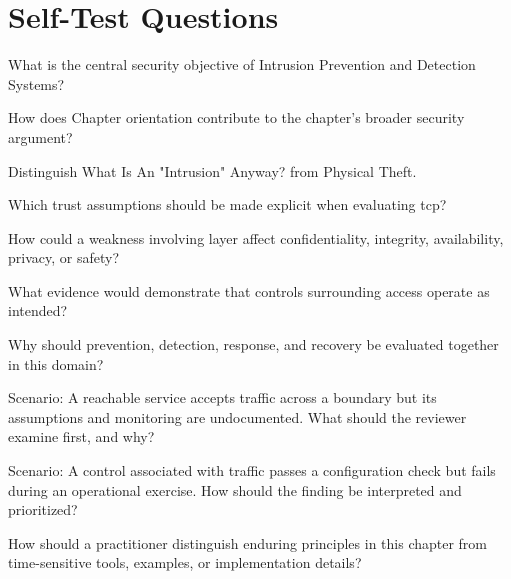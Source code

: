\documentclass[11pt,letterpaper]{article}
\begin{document}
\section*{Self-Test Questions}
\begin{CornellRecallList}
\item What is the central security objective of Intrusion Prevention and Detection Systems?
\item How does Chapter orientation contribute to the chapter's broader security argument?
\item Distinguish What Is An "Intrusion" Anyway? from Physical Theft.
\item Which trust assumptions should be made explicit when evaluating tcp?
\item How could a weakness involving layer affect confidentiality, integrity, availability, privacy, or safety?
\item What evidence would demonstrate that controls surrounding access operate as intended?
\item Why should prevention, detection, response, and recovery be evaluated together in this domain?
\item Scenario: A reachable service accepts traffic across a boundary but its assumptions and monitoring are undocumented. What should the reviewer examine first, and why?
\item Scenario: A control associated with traffic passes a configuration check but fails during an operational exercise. How should the finding be interpreted and prioritized?
\item How should a practitioner distinguish enduring principles in this chapter from time-sensitive tools, examples, or implementation details?
\end{CornellRecallList}
\end{document}
